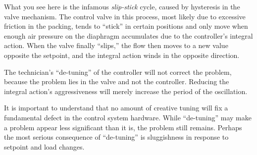 
What you see here is the infamous {\it slip-stick} cycle, caused by hysteresis in the valve mechanism.  The control valve in this process, most likely due to excessive friction in the packing, tends to ``stick'' in certain positions and only move when enough air pressure on the diaphragm accumulates due to the controller's integral action.  When the valve finally ``slips,'' the flow then moves to a new value opposite the setpoint, and the integral action winds in the opposite direction.
 
\vskip 10pt

The technician's ``de-tuning'' of the controller will not correct the problem, because the problem lies in the valve and not the controller.  Reducing the integral action's aggressiveness will merely increase the period of the oscillation.

\vskip 10pt

It is important to understand that no amount of creative tuning will fix a fundamental defect in the control system hardware.  While ``de-tuning'' may make a problem appear less significant than it is, the problem still remains.  Perhaps the most serious consequence of ``de-tuning'' is sluggishness in response to setpoint and load changes.












